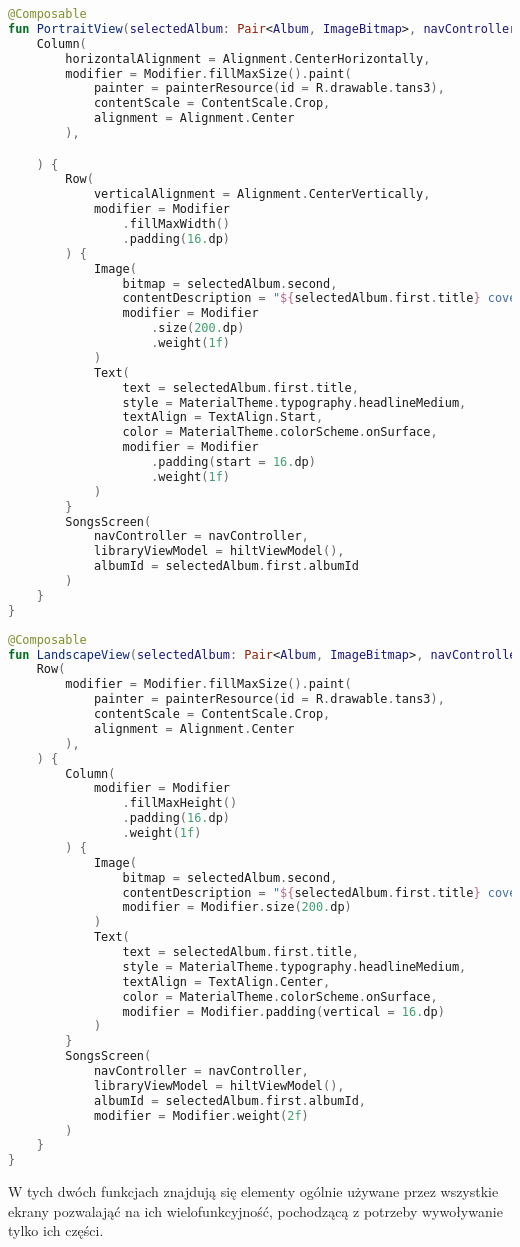 \begin{lstlisting}[caption=Kod \texttt{Navhost PortraitView}, label={lst:Navhost_P}, language=kotlin]
@Composable
fun PortraitView(selectedAlbum: Pair<Album, ImageBitmap>, navController: NavHostController) {
    Column(
        horizontalAlignment = Alignment.CenterHorizontally,
        modifier = Modifier.fillMaxSize().paint(
            painter = painterResource(id = R.drawable.tans3),
            contentScale = ContentScale.Crop,
            alignment = Alignment.Center
        ),

    ) {
        Row(
            verticalAlignment = Alignment.CenterVertically,
            modifier = Modifier
                .fillMaxWidth()
                .padding(16.dp)
        ) {
            Image(
                bitmap = selectedAlbum.second,
                contentDescription = "${selectedAlbum.first.title} cover",
                modifier = Modifier
                    .size(200.dp)
                    .weight(1f)
            )
            Text(
                text = selectedAlbum.first.title,
                style = MaterialTheme.typography.headlineMedium,
                textAlign = TextAlign.Start,
                color = MaterialTheme.colorScheme.onSurface,
                modifier = Modifier
                    .padding(start = 16.dp)
                    .weight(1f)
            )
        }
        SongsScreen(
            navController = navController,
            libraryViewModel = hiltViewModel(),
            albumId = selectedAlbum.first.albumId
        )
    }
}    
\end{lstlisting}
\begin{lstlisting}[caption=Kod \texttt{Navhost LandscapeView}, label={lst:Navhost_L}, language=kotlin]
@Composable
fun LandscapeView(selectedAlbum: Pair<Album, ImageBitmap>, navController: NavHostController) {
    Row(
        modifier = Modifier.fillMaxSize().paint(
            painter = painterResource(id = R.drawable.tans3),
            contentScale = ContentScale.Crop,
            alignment = Alignment.Center
        ),
    ) {
        Column(
            modifier = Modifier
                .fillMaxHeight()
                .padding(16.dp)
                .weight(1f)
        ) {
            Image(
                bitmap = selectedAlbum.second,
                contentDescription = "${selectedAlbum.first.title} cover",
                modifier = Modifier.size(200.dp)
            )
            Text(
                text = selectedAlbum.first.title,
                style = MaterialTheme.typography.headlineMedium,
                textAlign = TextAlign.Center,
                color = MaterialTheme.colorScheme.onSurface,
                modifier = Modifier.padding(vertical = 16.dp)
            )
        }
        SongsScreen(
            navController = navController,
            libraryViewModel = hiltViewModel(),
            albumId = selectedAlbum.first.albumId,
            modifier = Modifier.weight(2f)
        )
    }
}    
\end{lstlisting}
W tych dwóch funkcjach znajdują się elementy ogólnie używane przez wszystkie ekrany pozwalająć na ich wielofunkcyjność, pochodzącą z potrzeby wywoływanie tylko ich części.